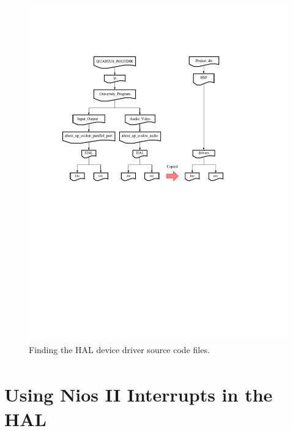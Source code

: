 \documentclass[11pt, twoside, pdftex]{article}
\begin{document}
\begin{figure}[h!]
   \begin{center}
      \includegraphics{figures/folders.pdf}
   \end{center}
   \caption{Finding the HAL device driver source code files.} 
	\label{fig:folders}
\end{figure}

\clearpage
\newpage
\section{Using Nios\textsuperscript{\textregistered} II Interrupts in the HAL}
\end{document}
